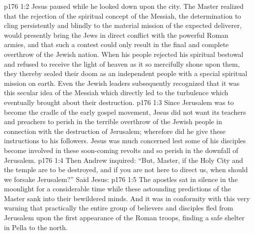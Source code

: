 \vs p176 1:2 Jesus paused while he looked down upon the city. The Master realized that the rejection of the spiritual concept of the Messiah, the determination to cling persistently and blindly to the material mission of the expected deliverer, would presently bring the Jews in direct conflict with the powerful Roman armies, and that such a contest could only result in the final and complete overthrow of the Jewish nation. When his people rejected his spiritual bestowal and refused to receive the light of heaven as it so mercifully shone upon them, they thereby sealed their doom as an independent people with a special spiritual mission on earth. Even the Jewish leaders subsequently recognized that it was this secular idea of the Messiah which directly led to the turbulence which eventually brought about their destruction.
\vs p176 1:3 Since Jerusalem was to become the cradle of the early gospel movement, Jesus did not want its teachers and preachers to perish in the terrible overthrow of the Jewish people in connection with the destruction of Jerusalem; wherefore did he give these instructions to his followers. Jesus was much concerned lest some of his disciples become involved in these soon\hyp{}coming revolts and so perish in the downfall of Jerusalem.
\vs p176 1:4 Then Andrew inquired: “But, Master, if the Holy City and the temple are to be destroyed, and if you are not here to direct us, when should we forsake Jerusalem?” Said Jesus: 
\vs p176 1:5 The apostles sat in silence in the moonlight for a considerable time while these astounding predictions of the Master sank into their bewildered minds. And it was in conformity with this very warning that practically the entire group of believers and disciples fled from Jerusalem upon the first appearance of the Roman troops, finding a safe shelter in Pella to the north.
